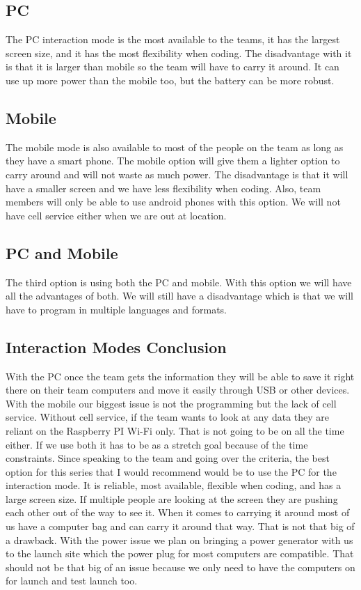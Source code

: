 \documentclass[10pt,draftclsnofoot,onecolumn]{IEEEtran}
\begin{document}
   	\subsection{PC}
    	The PC interaction mode is the most available to the teams, it has the largest screen size, and it has the most
	flexibility when coding. The disadvantage with it is that it is larger than mobile so the team will have to carry it around. 
	It can use up more power than the mobile too, but the battery can be more robust.
   	\subsection{Mobile}
     	The mobile mode is also available to most of the people on the team as long as they have a smart phone. 
	The mobile option will give them a lighter option to carry around and will not waste as much power. 
	The disadvantage is that it will have a smaller screen and we have less flexibility when coding. 
	Also, team members will only be able to use android phones with this option. 
	We will not have cell service either when we are out at location.
   	\subsection{PC and Mobile}
    	The third option is using both the PC and mobile. 
	With this option we will have all the advantages of both. 
	We will still have a disadvantage which is that we will have to program in multiple languages and formats. 
    	\subsection{Interaction Modes Conclusion}
     	With the PC once the team gets the information they will be able to save it right there on their team computers and move it
	easily through USB or other devices. 
	With the mobile our biggest issue is not the programming but the lack of cell service.
	Without cell service, if the team wants to look at any data they are reliant on the Raspberry PI Wi-Fi only. 
	That is not going to be on all the time either. 
	If we use both it has to be as a stretch goal because of the time constraints.  
      	Since speaking to the team and going over the criteria, the best option for this series that I would recommend would be to use
	the PC for the interaction mode. 
	It is reliable, most available, flexible when coding, and has a large screen size. 
	If multiple people are looking at the screen they are pushing each other out of the way to see it. 
	When it comes to carrying it around most of us have a computer bag and can carry it around that way. 
	That is not that big of a drawback. 
	With the power issue we plan on bringing a power generator with us to the launch site which the power plug for most computers
	are compatible. 
	That should not be that big of an issue because we only need to have the computers on for launch and test launch too.
	
\end{document}
